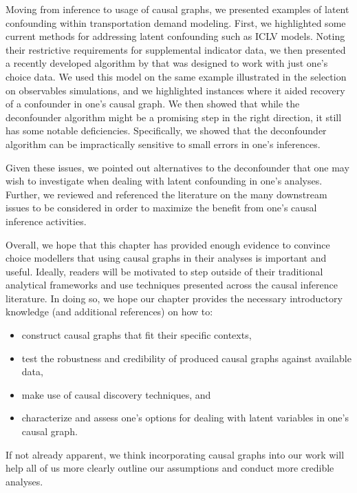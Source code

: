 Moving from inference to usage of causal graphs, we presented examples of latent confounding within transportation demand modeling.
First, we highlighted some current methods for addressing latent confounding such as ICLV models.
Noting their restrictive requirements for supplemental indicator data,
we then presented a recently developed algorithm by \citet{wang_2019_blessings}
that was designed to work with just one's choice data.
We used this model on the same example illustrated in the selection on observables simulations,
and we highlighted instances where it aided recovery of a confounder in one's causal graph.
We then showed that while the deconfounder algorithm might be a promising step in the right direction,
it still has some notable deficiencies.
Specifically, we showed that the deconfounder algorithm can be impractically sensitive to small errors in one's inferences.

Given these issues, we pointed out alternatives to the deconfounder that one may wish to investigate when dealing with latent confounding in one's analyses.
Further, we reviewed and referenced the literature on the many downstream issues to be considered in order to maximize the benefit from one's causal inference activities.

Overall, we hope that this chapter has provided enough evidence to convince choice modellers that using causal graphs in their analyses is important and useful.
Ideally, readers will be motivated to step outside of their traditional analytical frameworks and use techniques presented across the causal inference literature.
In doing so, we hope our chapter provides the necessary introductory knowledge (and additional references) on how to:
\begin{itemize}
    \item construct causal graphs that fit their specific contexts,
    \item test the robustness and credibility of produced causal graphs against available data,
    \item make use of causal discovery techniques, and
    \item characterize and assess one's options for dealing with latent variables in one's causal graph.
\end{itemize}
If not already apparent, we think incorporating causal graphs into our work will help all of us more clearly outline our assumptions and conduct more credible analyses.
